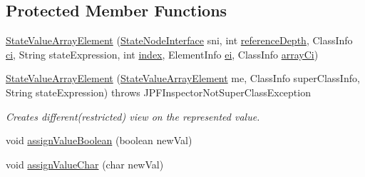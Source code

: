 \subsection*{Protected Member Functions}
\begin{DoxyCompactItemize}
\item 
\hyperlink{classgov_1_1nasa_1_1jpf_1_1inspector_1_1server_1_1programstate_1_1_state_value_array_element_a5dd2ea7761e6a0935bc236eef5bb5c9e}{State\+Value\+Array\+Element} (\hyperlink{interfacegov_1_1nasa_1_1jpf_1_1inspector_1_1server_1_1programstate_1_1_state_node_interface}{State\+Node\+Interface} sni, int \hyperlink{classgov_1_1nasa_1_1jpf_1_1inspector_1_1server_1_1programstate_1_1_state_node_a55683618625dae46e8aa68d95811d6bb}{reference\+Depth}, Class\+Info \hyperlink{classgov_1_1nasa_1_1jpf_1_1inspector_1_1server_1_1programstate_1_1_state_value_a0eb4aa1e630ed6372dcfb8c41ae7edc5}{ci}, String state\+Expression, int \hyperlink{classgov_1_1nasa_1_1jpf_1_1inspector_1_1server_1_1programstate_1_1_state_value_array_element_aa6411af2bddb25d2f9e779b08063e9e5}{index}, Element\+Info \hyperlink{classgov_1_1nasa_1_1jpf_1_1inspector_1_1server_1_1programstate_1_1_state_value_array_element_a6173229e69d8b4dfecb57a30187a72bc}{ei}, Class\+Info \hyperlink{classgov_1_1nasa_1_1jpf_1_1inspector_1_1server_1_1programstate_1_1_state_value_array_element_ad155b9daab791f6835f8b9a7fd793a72}{array\+Ci})
\item 
\hyperlink{classgov_1_1nasa_1_1jpf_1_1inspector_1_1server_1_1programstate_1_1_state_value_array_element_a4b82a12273bc29be675393fbbf7bb210}{State\+Value\+Array\+Element} (\hyperlink{classgov_1_1nasa_1_1jpf_1_1inspector_1_1server_1_1programstate_1_1_state_value_array_element}{State\+Value\+Array\+Element} me, Class\+Info super\+Class\+Info, String state\+Expression)  throws J\+P\+F\+Inspector\+Not\+Super\+Class\+Exception 
\begin{DoxyCompactList}\small\item\em Creates different(restricted) view on the represented value. \end{DoxyCompactList}\item 
void \hyperlink{classgov_1_1nasa_1_1jpf_1_1inspector_1_1server_1_1programstate_1_1_state_value_array_element_aea79e3efeb4e316b007d5b1c9cd6ccab}{assign\+Value\+Boolean} (boolean new\+Val)
\item 
void \hyperlink{classgov_1_1nasa_1_1jpf_1_1inspector_1_1server_1_1programstate_1_1_state_value_array_element_a4889561cbf7857cb6a92eb28ba7663cb}{assign\+Value\+Char} (char new\+Val)
\item 

\end{DoxyCompactItemize}
